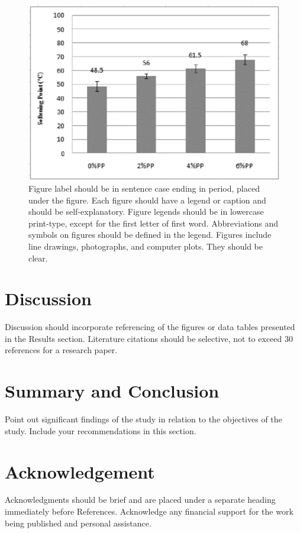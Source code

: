 \documentclass{strrespaper-journ}
\begin{document}
	        \begin{figure}[htbp]
	            \centering
	            \includegraphics[width=\linewidth]{../sample/graphics/bar_graph}
	            \caption{Figure label should be in sentence case ending in period, placed under the figure.  Each figure should have a legend or caption and should be self-explanatory. Figure legends should be in lowercase print-type, except for the first letter of first word. Abbreviations and symbols on figures should be defined in the legend. Figures include line drawings, photographs, and computer plots. They should be clear.}
	            \label{fig:bar_graph}
	        \end{figure}

    \section{Discussion}
	    Discussion should incorporate referencing of the figures or data tables presented in the Results section. Literature citations should be selective, not to exceed 30 references for a research paper.

    \section{Summary and Conclusion}
	    Point out significant findings of the study in relation to the objectives of the study. Include your recommendations in this section.

    \section{Acknowledgement}
	    Acknowledgments should be brief and are placed under a separate heading immediately before References. Acknowledge any financial support for the work being published and personal assistance.
\end{document}
